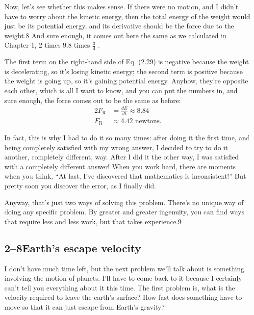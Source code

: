 \documentclass[11pt,oneside]{article}
\providecommand{\ddt}[2]{\frac{d#1}{d#2}}
\begin{document}
Now, let's see whether this makes sense. If there were no motion, and I didn't have to worry about the kinetic energy, then the total energy of the weight would just be its potential energy, and its derivative should be the force due to the weight.8 And sure enough, it comes out here the same as we calculated in Chapter 1, \(2\) times \(9.8\) times \(\frac{3}{4}\) .\par

The first term on the right-hand side of Eq. (2.29) is negative because the weight is decelerating, so it's losing kinetic energy; the second term is positive because the weight is going up, so it's gaining potential energy. Anyhow, they're opposite each other, which is all I want to know, and you can put the numbers in, and sure enough, the force comes out to be the same as before: 
\begin{equation*} \begin{aligned} 2F_\text{R} &= \ddt{E}{t} \approx 8.84\\[1ex] F_\text{R} &\approx 4.42 \text{ newtons}. \end{aligned} \tag{2.30}
\label{Eq:TIPS:2:30} \end{equation*}
\par

In fact, this is why I had to do it so many times: after doing it the first time, and being completely satisfied with my wrong answer, I decided to try to do it another, completely different, way. After I did it the other way, I was satisfied with a completely different answer! When you work hard, there are moments when you think, ``At last, I've discovered that mathematics is inconsistent!'' But pretty soon you discover the error, as I finally did.\par

Anyway, that's just two ways of solving this problem. There's no unique way of doing any specific problem. By greater and greater ingenuity, you can find ways that require less and less work, but that takes experience.9\par

\subsection*{2--8Earth's escape velocity}

I don't have much time left, but the next problem we'll talk about is something involving the motion of planets. I'll have to come back to it because I certainly can't tell you everything about it this time. The first problem is, what is the velocity required to leave the earth's surface? How fast does something have to move so that it can just escape from Earth's gravity?\par
\end{document}
